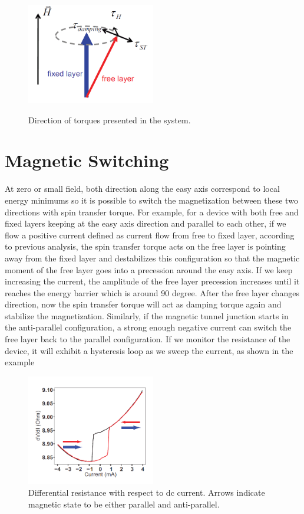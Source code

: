 \begin{figure}[h!]
\centering
\includegraphics[width=0.5\textwidth]{fig/dampingtorque.PNG}
\label{Torque}
\caption{Direction of torques presented in the system.}

\end{figure}


\section{Magnetic Switching}

At zero or small field, both direction along the easy axis correspond to local energy minimums so it is possible to switch the magnetization between these two directions with spin transfer torque. For example, for a device with both free and fixed layers keeping at the easy axis direction and parallel to each other, if we flow a positive current defined as current flow from free to fixed layer, according to previous analysis, the spin transfer torque acts on the free layer is pointing away from the fixed layer and destabilizes this configuration so that the magnetic moment of the free layer goes into a precession around the easy axis. If we keep increasing the current, the amplitude of the free layer precession increases until it reaches the energy barrier which is around 90 degree. After the free layer changes direction, now the spin transfer torque will act as damping torque again and stabilize the magnetization. Similarly, if the magnetic tunnel junction starts in the anti-parallel configuration, a strong enough negative current can switch the free layer back to the parallel configuration. If we monitor the resistance of the device, it will exhibit a hysteresis loop as we sweep the current, as shown in the example

\begin{figure}[h!]
	\centering
	\includegraphics[width=0.5\textwidth]{fig/DC.PNG}
	\caption{Differential resistance with respect to dc current. Arrows indicate magnetic state to be either parallel and anti-parallel.}
	\label{fig:DC}
\end{figure}




